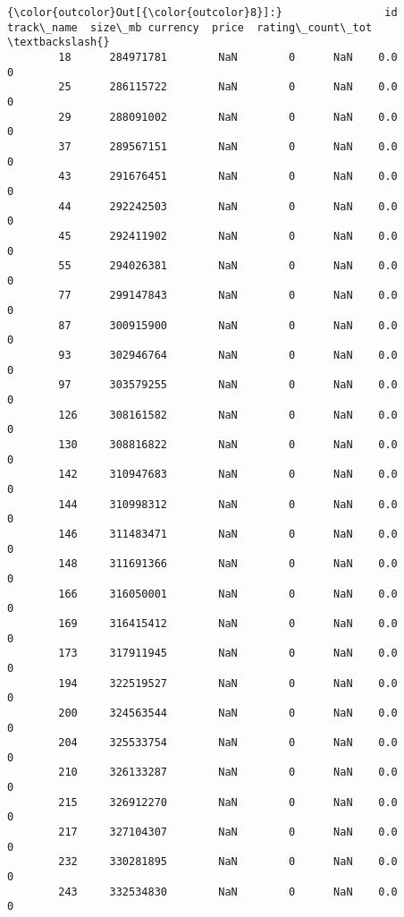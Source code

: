 \documentclass[11pt]{article}
\begin{document}
\begin{Verbatim}[commandchars=\\\{\}]
{\color{outcolor}Out[{\color{outcolor}8}]:}                id track\_name  size\_mb currency  price  rating\_count\_tot  \textbackslash{}
        18      284971781        NaN        0      NaN    0.0                 0   
        25      286115722        NaN        0      NaN    0.0                 0   
        29      288091002        NaN        0      NaN    0.0                 0   
        37      289567151        NaN        0      NaN    0.0                 0   
        43      291676451        NaN        0      NaN    0.0                 0   
        44      292242503        NaN        0      NaN    0.0                 0   
        45      292411902        NaN        0      NaN    0.0                 0   
        55      294026381        NaN        0      NaN    0.0                 0   
        77      299147843        NaN        0      NaN    0.0                 0   
        87      300915900        NaN        0      NaN    0.0                 0   
        93      302946764        NaN        0      NaN    0.0                 0   
        97      303579255        NaN        0      NaN    0.0                 0   
        126     308161582        NaN        0      NaN    0.0                 0   
        130     308816822        NaN        0      NaN    0.0                 0   
        142     310947683        NaN        0      NaN    0.0                 0   
        144     310998312        NaN        0      NaN    0.0                 0   
        146     311483471        NaN        0      NaN    0.0                 0   
        148     311691366        NaN        0      NaN    0.0                 0   
        166     316050001        NaN        0      NaN    0.0                 0   
        169     316415412        NaN        0      NaN    0.0                 0   
        173     317911945        NaN        0      NaN    0.0                 0   
        194     322519527        NaN        0      NaN    0.0                 0   
        200     324563544        NaN        0      NaN    0.0                 0   
        204     325533754        NaN        0      NaN    0.0                 0   
        210     326133287        NaN        0      NaN    0.0                 0   
        215     326912270        NaN        0      NaN    0.0                 0   
        217     327104307        NaN        0      NaN    0.0                 0   
        232     330281895        NaN        0      NaN    0.0                 0   
        243     332534830        NaN        0      NaN    0.0                 0   

\end{Verbatim}
\end{document}
